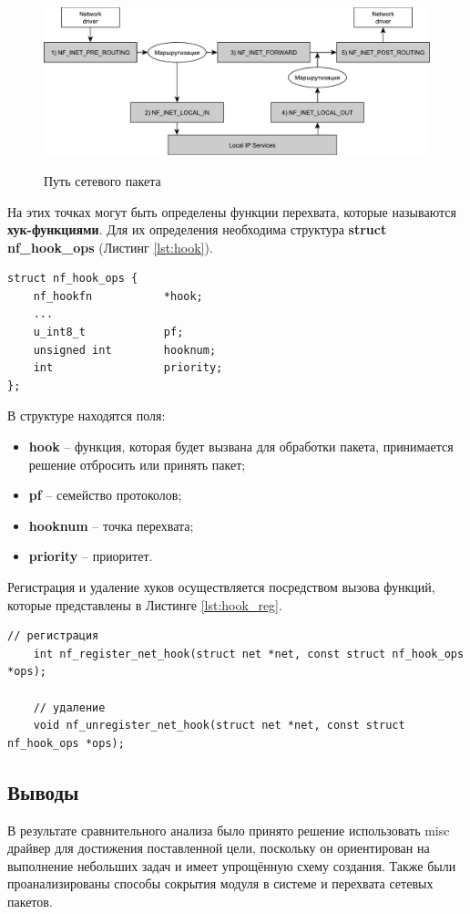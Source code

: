 \begin{figure}[ph!]
	\centering
	\begin{center}
		{\includegraphics[scale=0.6]{img/packets.pdf}}
		\caption{Путь сетевого пакета}
		\label{fig2:image}
	\end{center}
\end{figure}

На этих точках могут быть определены функции перехвата, которые называются \textbf{хук-функциями}. Для их определения необходима структура \textbf{struct nf\_hook\_ops} (Листинг \ref{lst:hook}).

\begin{lstlisting}[caption = {struct nf\_hook\_ops}, label=lst:hook]
struct nf_hook_ops {
	nf_hookfn			*hook;
	...
	u_int8_t			pf;
	unsigned int		hooknum;
	int					priority;
};
\end{lstlisting}

В структуре находятся поля:
\begin{itemize}
	\item \textbf{hook} -- функция, которая будет вызвана для обработки пакета, принимается решение отбросить или принять пакет;
	
	\item \textbf{pf} -- семейство протоколов;
	
	\item \textbf{hooknum} -- точка перехвата;
	
	\item \textbf{priority} -- приоритет. \\
\end{itemize}

Регистрация и удаление хуков осуществляется посредством вызова функций, которые представлены в Листинге \ref{lst:hook_reg}.

\begin{lstlisting}[caption = {Функции для регистрации и удаления хук-функций}, label=lst:hook_reg]
	// регистрация
	int nf_register_net_hook(struct net *net, const struct nf_hook_ops *ops);
	
	// удаление
	void nf_unregister_net_hook(struct net *net, const struct nf_hook_ops *ops);
\end{lstlisting}

\subsection{Выводы}
В результате сравнительного анализа было принято решение использовать misc драйвер для достижения поставленной цели, поскольку он ориентирован на выполнение небольших задач и имеет упрощённую схему создания. Также были проанализированы  способы сокрытия модуля в системе и перехвата сетевых пакетов.



 